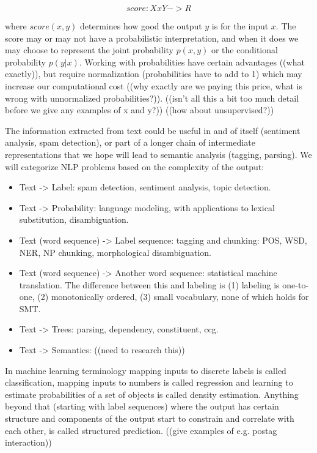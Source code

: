 \documentclass[ignorenonframetext]{beamer}
\begin{document}
\[ score: X x Y -> R \]

where $score(x, y)$ determines how good the output $y$ is for the
input $x$.  The score may or may not have a probabilistic
interpretation, and when it does we may choose to represent the joint
probability $p(x, y)$ or the conditional probability $p(y|x)$.
Working with probabilities have certain advantages ((what exactly)),
but require normalization (probabilities have to add to 1) which may
increase our computational cost ((why exactly are we paying this
price, what is wrong with unnormalized probabilities?)).  ((isn't all
this a bit too much detail before we give any examples of x and y?))
((how about unsupervised?))

The information extracted from text could be useful in and of itself
(sentiment analysis, spam detection), or part of a longer chain of
intermediate representations that we hope will lead to semantic
analysis (tagging, parsing).  We will categorize NLP problems based on
the complexity of the output:

\begin{itemize}
\item Text -> Label: spam detection, sentiment analysis, topic
  detection.
\item Text -> Probability: language modeling, with applications to
  lexical substitution, disambiguation.
\item Text (word sequence) -> Label sequence: tagging and chunking:
  POS, WSD, NER, NP chunking, morphological disambiguation.
\item Text (word sequence) -> Another word sequence: statistical
  machine translation.  The difference between this and labeling is
  (1) labeling is one-to-one, (2) monotonically ordered, (3) small
  vocabulary, none of which holds for SMT.
\item Text -> Trees: parsing, dependency, constituent, ccg.
\item Text -> Semantics: ((need to research this))
\end{itemize}

In machine learning terminology mapping inputs to discrete labels is
called classification, mapping inputs to numbers is called regression
and learning to estimate probabilities of a set of objects is called
density estimation.  Anything beyond that (starting with label
sequences) where the output has certain structure and components of
the output start to constrain and correlate with each other, is called
structured prediction.  ((give examples of e.g. postag interaction))
\end{document}
